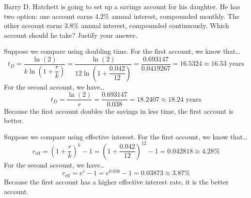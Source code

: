 \documentclass[11pt,letterpaper]{article}
\begin{document}
 Barry D. Hatchett is going to set up a savings account for his daughter. He has two option: one account earns 4.2\% annual interest, compounded monthly. The other account earns 3.8\% annual interest, compounded continuously. Which account should he take? Justify your answer. \pspace

\sol Suppose we compare using doubling time. For the first account, we know that\dots
	\[
	t_D= \dfrac{\ln(2)}{k \ln \left(1 + \dfrac{r}{k} \right)}= \dfrac{\ln(2)}{12 \ln \left(1 + \dfrac{0.042}{12} \right)}= \dfrac{0.693147}{0.0419267}= 16.5324 \approx 16.53 \text{ years}
	\]
For the second account, we have\dots
	\[
	t_D= \dfrac{\ln(2)}{r}= \dfrac{0.693147}{0.038}= 18.2407 \approx 18.24 \text{ years}
	\]
Because the first account doubles the savings in less time, the first account is better. \pspace

Suppose we compare using effective interest. For the first account, we know that\dots
	\[
	r_{\text{eff}}= \left(1 + \dfrac{r}{k} \right)^k - 1= \left(1 + \dfrac{0.042}{12} \right)^{12} - 1= 0.042818 \approx 4.28\%
	\]
For the second account, we have\dots
	\[
	r_{\text{eff}}= e^r - 1= e^{0.038} - 1= 0.03873 \approx 3.87\%
	\]
Because the first account has a higher effective interest rate, it is the better account. 
\end{document}
